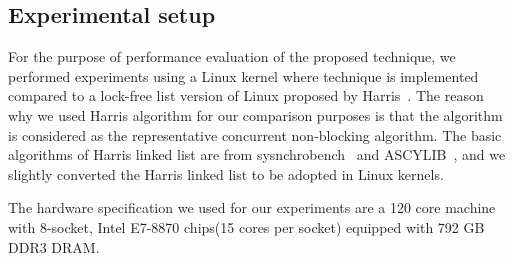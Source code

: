 \subsection{Experimental setup}


For the purpose of performance evaluation of the proposed 
\LDU technique, we performed experiments using a Linux kernel
where \LDU technique is implemented compared to a lock-free list
version of Linux proposed by Harris~\cite{Harris2001Lockfree}.
The reason why we used Harris algorithm for our comparison 
purposes is that the algorithm is considered as the representative
concurrent non-blocking algorithm.
The basic algorithms of Harris linked list are from sysnchrobench~\cite{Gramoli2015Synchrobench}
and ASCYLIB~\cite{David2015ASYNCHRONIZED}, and we slightly converted the
Harris linked list to be adopted in Linux kernels.

The hardware specification we used for our experiments
are a 120 core machine with 8-socket, Intel
E7-8870 chips(15 cores per socket) equipped with 792 GB DDR3 DRAM.


